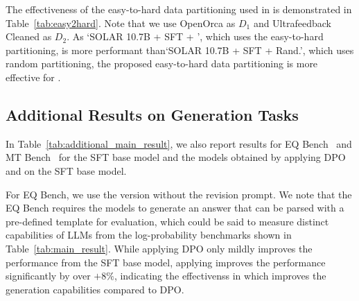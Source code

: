The effectiveness of the easy-to-hard data partitioning used in \method is demonstrated in Table~\ref{tab:easy2hard}.
Note that we use OpenOrca as $D_1$ and Ultrafeedback Cleaned as $D_2$.
As `SOLAR 10.7B + SFT + \method', which uses the easy-to-hard partitioning, is more performant than`SOLAR 10.7B + SFT + \method Rand.', which uses random partitioning, the proposed easy-to-hard data partitioning is more effective for \method.

\subsection{Additional Results on Generation Tasks}
\label{sec:additional_results}

\begin{table}[t!]
\centering
{}
\caption{Additional results on EQ Bench~\cite{paech2023eq} and MT Bench~\cite{zheng2023judging}, both of which are generation tasks that highly correlate with the Chatbot Arena ELO~\cite{zheng2023judging,chiang2024chatbotarenaopenplatform}. The best scores for both benchmarks are shown in bold.}
\label{tab:additional_main_result}
\end{table}

In Table~\ref{tab:additional_main_result}, we also report results for EQ Bench~\cite{paech2023eq} and MT Bench~\cite{zheng2023judging} for the SFT base model and the models obtained by applying DPO and \method on the SFT base model.

For EQ Bench, we use the version without the revision prompt.
We note that the EQ Bench requires the models to generate an answer that can be parsed with a pre-defined template for evaluation, which could be said to measure distinct capabilities of LLMs from the log-probability benchmarks shown in Table~\ref{tab:main_result}.
While applying DPO only mildly improves the performance from the SFT base model, applying \method improves the performance significantly by over $+8\%$, indicating the effectivenss in which \method improves the generation capabilities compared to DPO.


